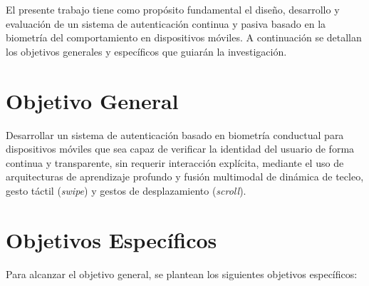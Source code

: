 
El presente trabajo tiene como propósito fundamental el diseño, desarrollo y evaluación de un sistema de 
autenticación continua y pasiva basado en la biometría del comportamiento en dispositivos móviles. A 
continuación se detallan los objetivos generales y específicos que guiarán la investigación.

\section{Objetivo General}

Desarrollar un sistema de autenticación basado en biometría conductual para dispositivos móviles que sea capaz de verificar la identidad 
del usuario de forma continua y transparente, sin requerir interacción explícita, mediante el uso de 
arquitecturas de aprendizaje profundo y fusión multimodal de dinámica de tecleo, gesto táctil (\textit{swipe}) y gestos de desplazamiento (\textit{scroll}).

\section{Objetivos Específicos}

Para alcanzar el objetivo general, se plantean los siguientes objetivos específicos:

